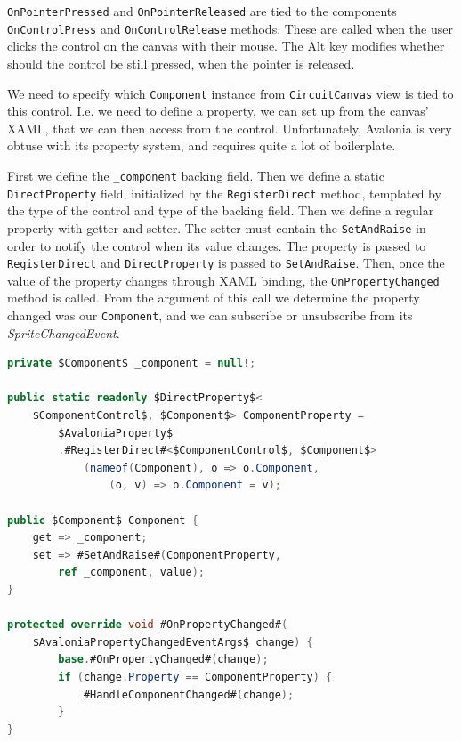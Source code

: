 \texttt{OnPointerPressed} and \texttt{OnPointerReleased} are tied to the components \texttt{OnControlPress} and \texttt{OnControlRelease} methods. These are called when the user clicks the control on the canvas with their mouse. The Alt key modifies whether should the control be still pressed, when the pointer is released.

We need to specify which \texttt{Component} instance from \texttt{CircuitCanvas} view is tied to this control. I.e. we need to define a property, we can set up from the canvas' XAML, that we can then access from the control. Unfortunately, Avalonia is very obtuse with its property system, and requires quite a lot of boilerplate.

First we define the \texttt{\_component} backing field. Then we define a static \texttt{DirectProperty} field, initialized by the \texttt{RegisterDirect} method, templated by the type of the control and type of the backing field. Then we define a regular property with getter and setter. The setter must contain the \texttt{SetAndRaise} in order to notify the control when its value changes. The property is passed to \texttt{RegisterDirect} and \texttt{DirectProperty} is passed to \texttt{SetAndRaise}. Then, once the value of the property changes through XAML binding, the \texttt{OnPropertyChanged} method is called. From the argument of this call we determine the property changed was our \texttt{Component}, and we can subscribe or unsubscribe from its \textit{SpriteChangedEvent}.

\begin{lstlisting}[language=csharp, caption={Property setup in \texttt{ComponentControl}}]
private $Component$ _component = null!;

public static readonly $DirectProperty$<
    $ComponentControl$, $Component$> ComponentProperty = 
        $AvaloniaProperty$
        .#RegisterDirect#<$ComponentControl$, $Component$>
            (nameof(Component), o => o.Component,
                (o, v) => o.Component = v);

public $Component$ Component {
    get => _component;
    set => #SetAndRaise#(ComponentProperty, 
        ref _component, value);
}

protected override void #OnPropertyChanged#(
    $AvaloniaPropertyChangedEventArgs$ change) {
        base.#OnPropertyChanged#(change);
        if (change.Property == ComponentProperty) {
            #HandleComponentChanged#(change);
        }
}
\end{lstlisting}


